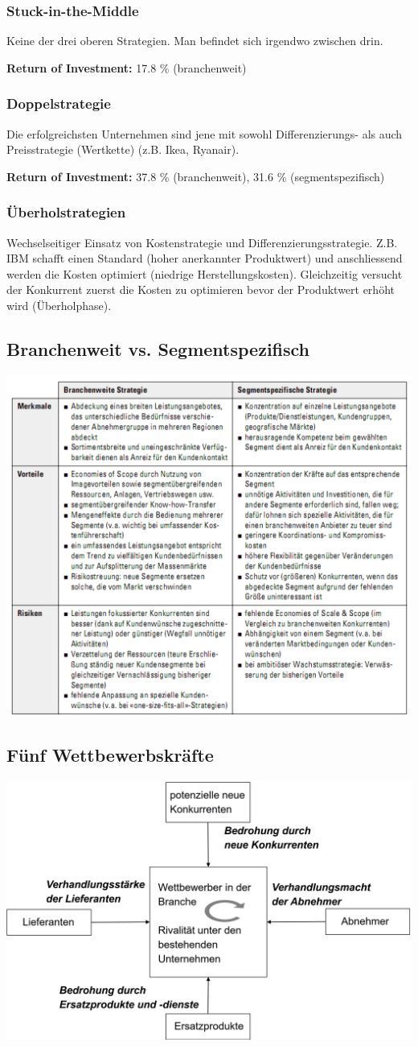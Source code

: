 \subsubsection{Stuck-in-the-Middle}
Keine der drei oberen Strategien. Man befindet sich irgendwo zwischen drin.

\textbf{Return of Investment:} 17.8 \% (branchenweit)

\subsubsection{Doppelstrategie}
Die erfolgreichsten Unternehmen sind jene mit sowohl Differenzierungs- als auch Preisstrategie (Wertkette) (z.B. Ikea, Ryanair).

\textbf{Return of Investment:} 37.8 \% (branchenweit), 31.6 \% (segmentspezifisch)

\subsubsection{Überholstrategien}
Wechselseitiger Einsatz von Kostenstrategie und Differenzierungsstrategie. Z.B. IBM schafft einen Standard (hoher anerkannter Produktwert) und anschliessend werden die Kosten optimiert (niedrige Herstellungskosten). Gleichzeitig versucht der Konkurrent zuerst die Kosten zu optimieren bevor der Produktwert erhöht wird (Überholphase).

\subsection{Branchenweit vs. Segmentspezifisch}
\includegraphics[width=0.7\linewidth]{images/branche_vs_segment}

\subsection{Fünf Wettbewerbskräfte}
\includegraphics[width=0.5\linewidth]{images/five_forces}

